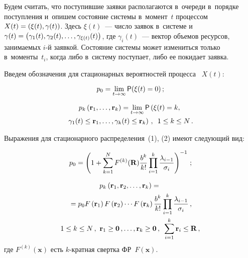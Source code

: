 \begin{multicols}{2}
  Будем считать, что поступившие заявки располагаются в~очереди 
в~порядке поступления и~опишем состояние сис\-те\-мы в~момент~$t$ 
процессом $X(t)\hm= (\xi(t), \gamma(t))$. Здесь $\xi(t)$~--- число заявок 
в~сис\-те\-ме и~$\gamma(t)\hm= \left( \gamma_1(t), \gamma_2(t), \ldots, 
\gamma_{\xi(t)}(t)\right)$, где $\gamma_i(t)$~--- вектор объемов ресурсов, 
занимаемых $i$-й заявкой. Со\-сто\-яние сис\-те\-мы может измениться только 
в~моменты~$t_i$, когда либо в~сис\-те\-му поступает, либо ее покидает заявка. 
  
  Введем обозначения для стационарных вероятностей процесса ~$X(t)$:
  
  \noindent
   \begin{equation}
   p_0 = \lim\limits_{t\to\infty} {\sf P}(\xi(t)=0)\,;\label{e1-sop}
   \end{equation}
   
   \noindent
   \begin{multline}
   p_k\left(\mathbf{r}_1, \ldots, \mathbf{r}_k\right) =
    \lim\limits_{t\to\infty} {\sf P}\left( \xi(t)=k, \right.\\
\left.\gamma_1(t)\leq \mathbf{r}_1,\ldots, \gamma_k(t)\leq \mathbf{r}_k\right)\,,\enskip 
1\leq k\leq 
N\,.\label{e2-sop}
   \end{multline}
  
  Выражения для стационарного распределения~(1), (2) имеют сле\-ду\-ющий 
вид:

\noindent
  \begin{equation*}
  p_0=\left( 1+\sum\limits^N_{k=1} F^{(k)} (\mathbf{R}) 
\displaystyle\frac{\displaystyle b^k\mathstrut}{\displaystyle k!\mathstrut}\prod\limits^k_{i=1} \displaystyle\frac{\displaystyle \lambda_{i-1}\mathstrut}{\displaystyle \sigma_i\mathstrut} \right)^{-
1}\,;
  \end{equation*}
  
  \vspace*{-16pt}
  
  \noindent
  \begin{multline}
  p_k\left( \mathbf{r}_1, \mathbf{r}_2, \ldots, \mathbf{r}_k\right) ={}\\
  {}=p_0 F\left( 
\mathbf{r}_1\right) F\left( \mathbf{r}_2\right) \cdots F\left( \mathbf{r}_k\right) 
\displaystyle\frac{\displaystyle b^k\mathstrut}{\displaystyle k!\mathstrut}\prod\limits^k_{i=1} \displaystyle\frac{\displaystyle \lambda_{i-1}\mathstrut}{\displaystyle \sigma_i\mathstrut}\,,\\
  1\leq k\leq N\,,\ \mathbf{r}_1\geq \mathbf{0}\,,\ldots, \mathbf{r}_k\geq \mathbf{0}\,,\enskip 
\sum\limits^k_{i=1} \mathbf{r}_i\leq \mathbf{R}\,,
  \label{e4-sop}
  \end{multline}
  где $F^{(k)}(\mathbf{x})$ есть $k$-крат\-ная свертка 
ФР~$F(\mathbf{x})$.


\end{multicols}

